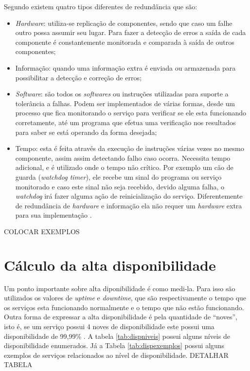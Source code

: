 Segundo \cite{norvag2000} existem quatro tipos diferentes de redundância que são:
\begin{itemize}
 \item \textit{Hardware}: utiliza-se replicação de componentes, sendo que caso um falhe outro possa assumir seu lugar. 
 Para fazer a detecção de erros a saída de cada componente é constantemente monitorada e comparada à saída de outros componentes;
 \item Informação: quando uma informação extra é enviada ou armazenada para possibilitar a detecção e correção de erros;
 \item \textit{Software}: são todos os \textit{softwares} ou instruções utilizadas para suporte a tolerância a falhas. Podem ser implementados
 de várias formas, desde um processo que fica monitorando o serviço para verificar se ele esta funcionando corretamente, até um programa
 que efetua uma verificação nos resultados para saber se está operando da forma desejada;
 \item Tempo: esta é feita através da execução de instruções várias vezes no mesmo componente, assim assim detectando falho caso ocorra.
 Necessita tempo adicional, e é utilizado onde o tempo não crítico. Por exemplo um cão de guarda (\textit{watchdog timer}), ele
 recebe um sinal do programa ou serviço monitorado e caso este sinal não seja recebido, devido alguma falha, o \textit{watchdog} irá fazer 
 alguma ação de reinicialização do serviço.
 Diferentemente de redundância de \textit{hardware} e informação ela não requer um \textit{hardware} extra para sua implementação \cite{costa2009}.
\end{itemize} COLOCAR EXEMPLOS

\section{Cálculo da alta disponibilidade}

Um ponto importante sobre alta diponibilidade é como medi-la. Para isso são utilizados os valores de \textit{uptime} e 
\textit{downtime}, que são respectivamente o tempo que os serviços esta funcionando normalmente e o tempo que não estão funcionando.
Outra forma de expressar a alta disponibilidade é pela quantidade de ``noves'', isto é, se um serviço possui 4 noves de disponibilidade
este possui uma disponibilidade de 99,99\% \cite{filho2004}.
A tabela \ref{tab:dispniveis} possui alguns níveis de disponibilidade enumerados. Já a Tabela \ref{tab:dispexemplos} 
possui alguns exemplos de serviços relacionados ao nível de disponibilidade. DETALHAR TABELA


